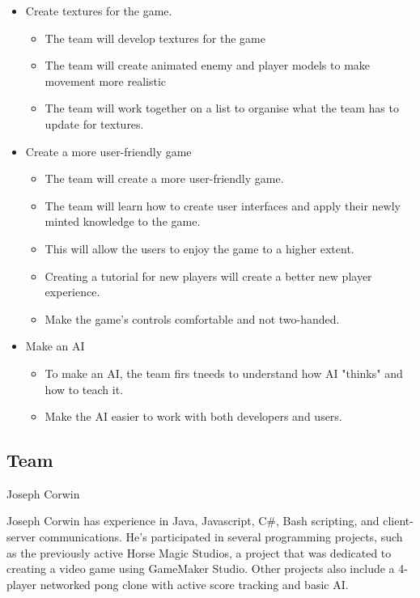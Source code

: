 \documentclass[11pt]{article}
\begin{document}
\begin{itemize}
	\item Create textures for the game.
		\begin{itemize}
			\item The team will develop textures for the game
			\item The team will create animated enemy and player models to make movement more realistic
			\item The team will work together on a list to organise what the team has to update for textures.
		\end{itemize}
	\item Create a more user-friendly game
		\begin{itemize}
			\item The team will create a more user-friendly game.
			\item The team will learn how to create user interfaces and apply their newly minted knowledge to the game.
			\item This will allow the users to enjoy the game to a higher extent.
			\item Creating a tutorial for new players will create a better new player experience.
			\item Make the game's controls comfortable and not two-handed.
		\end{itemize}
	\item Make an AI
		\begin{itemize}
			\item To make an AI, the team firs tneeds to understand how AI "thinks" and how to teach it.
			\item Make the AI easier to work with both developers and users.
		\end{itemize}
\end{itemize}

\subsection{{\color{blue}Team}}

{\large {\color{orange}Joseph Corwin}}

Joseph Corwin has experience in Java, Javascript, C\#, Bash scripting, and client-server communications. He's participated in several programming projects, such as the previously active Horse Magic Studios, a project that was dedicated to creating a video game using GameMaker Studio. Other projects also include a 4-player networked pong clone with active score tracking and basic AI.
\end{document}
